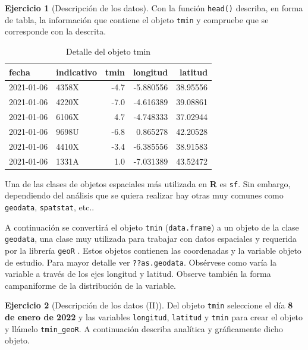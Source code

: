 \documentclass[
]{book}
\theoremstyle{definition}
\theoremstyle{definition}
\theoremstyle{definition}
\newtheorem{exercise}{Ejercicio}[chapter]
\theoremstyle{definition}
\theoremstyle{remark}
\begin{document}
\begin{exercise}[Descripción de los datos]
\protect\hypertarget{exr:ex3}{}\label{exr:ex3}Con la función \texttt{head()} describa, en forma de tabla, la información que contiene
el objeto \texttt{tmin} y compruebe que se corresponde con la descrita.
\end{exercise}

\begin{table}

\caption{\label{tab:tmin-head}Detalle del objeto tmin}
\centering
\begin{tabular}[t]{l|l|r|r|r}
\hline
fecha & indicativo & tmin & longitud & latitud\\
\hline
2021-01-06 & 4358X & -4.7 & -5.880556 & 38.95556\\
\hline
2021-01-06 & 4220X & -7.0 & -4.616389 & 39.08861\\
\hline
2021-01-06 & 6106X & 4.7 & -4.748333 & 37.02944\\
\hline
2021-01-06 & 9698U & -6.8 & 0.865278 & 42.20528\\
\hline
2021-01-06 & 4410X & -3.4 & -6.385556 & 38.91583\\
\hline
2021-01-06 & 1331A & 1.0 & -7.031389 & 43.52472\\
\hline
\end{tabular}
\end{table}

Una de las clases de objetos espaciales más utilizada en \textbf{R} es \texttt{sf}. Sin
embargo, dependiendo del análisis que se quiera realizar hay otras muy comunes
como \texttt{geodata}, \texttt{spatstat}, etc..

A continuación se convertirá el objeto \texttt{tmin} (\texttt{data.frame}) a un objeto de la
clase \texttt{geodata}, una clase muy utilizada para trabajar con datos espaciales y
requerida por la librería \texttt{geoR} \citep{R-geor}. Estos objetos contienen las
coordenadas y la variable objeto de estudio. Para mayor detalle ver
\texttt{??as.geodata}. Obsérvese como varía la variable a través de los ejes longitud y
latitud. Observe también la forma campaniforme de la distribución de la
variable.

\begin{exercise}[Descripción de los datos (II)]
\protect\hypertarget{exr:ex4}{}\label{exr:ex4}Del objeto \texttt{tmin} seleccione el día \textbf{8 de enero de 2022} y las variables
\texttt{longitud}, \texttt{latitud} y \texttt{tmin} para crear el objeto y llámelo \texttt{tmin\_geoR}. A
continuación describa analítica y gráficamente dicho objeto.
\end{exercise}
\end{document}
